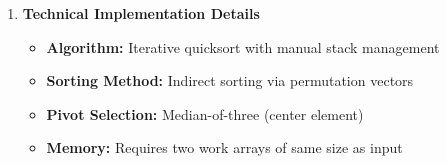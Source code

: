 \begin{enumerate}
\begin{enumerate}
\begin{itemize}
\begin{itemize}
                            \item \texttt{perm}: Permutation vector that will be sorted
                                  
                            \item \texttt{stack\_left}: Manual stack of left indices
                                  
                            \item \texttt{stack\_right}: Manual stack of right indices
                          \end{itemize}
                  \end{itemize}
                  
                  \textbf{Sorting Usage Example:} 
                  \begin{lstlisting}[language=Fortran]
use f42_utils
use iso_fortran_env, only: real64, int32

real(real64) :: expression_data(1000)
integer(int32) :: perm(1000), stack_left(1000), stack_right(1000)
integer :: i

! Initialize permutation
do i = 1, 1000
perm(i) = i
end do

! Sort expression data indirectly
call sort_real(expression_data, perm, stack_left, stack_right)

! Access sorted data through permutation
! expression_data(perm(1)) is the smallest value
! expression_data(perm(1000)) is the largest value
            \end{lstlisting}
            
            \item \textbf{Technical Implementation Details}
                  
                  \begin{itemize}
                    \item \textbf{Algorithm:} Iterative quicksort with manual stack
                          management
                          
                    \item \textbf{Sorting Method:} Indirect sorting via permutation
                          vectors
                          
                    \item \textbf{Pivot Selection:} Median-of-three (center element)
                          
                    \item \textbf{Memory:} Requires two work arrays of same size as
                          input
                          

\end{itemize}
\end{enumerate}
\end{enumerate}
